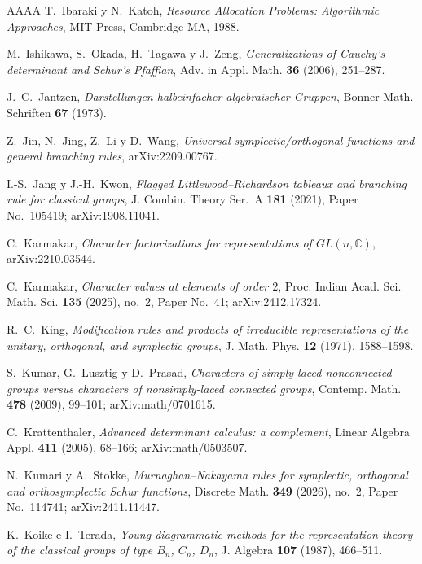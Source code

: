 \documentclass[11pt,reqno]{amsart}
\theoremstyle{plain}
\theoremstyle{definition}
\newcommand{\CC}{\mathbb{C}}
\begin{document}
\begin{thebibliography}{AAAA}
 T.~Ibaraki y N.~Katoh, \emph{Resource Allocation Problems: Algorithmic
Approaches}, MIT Press, Cambridge MA, 1988.

 M.~Ishikawa, S.~Okada, H.~Tagawa y J.~Zeng, \emph{Generalizations of
Cauchy's determinant and Schur's Pfaffian}, Adv. in Appl. Math. \textbf{36} (2006), 251--287.

 J.~C.~Jantzen, \emph{Darstellungen halbeinfacher algebraischer Gruppen},
Bonner Math. Schriften \textbf{67} (1973).

 Z.~Jin, N.~Jing, Z.~Li y D.~Wang, \emph{Universal symplectic/orthogonal
functions and general branching rules}, arXiv:2209.00767.

 I.-S.~Jang y J.-H.~Kwon, \emph{Flagged Littlewood--Richardson tableaux
and branching rule for classical groups}, J. Combin. Theory Ser.~A \textbf{181} (2021),
Paper No.~105419; arXiv:1908.11041.

 C.~Karmakar, \emph{Character factorizations for representations of
$GL(n,\CC)$}, arXiv:2210.03544.

 C.~Karmakar, \emph{Character values at elements of order $2$},
Proc. Indian Acad. Sci. Math. Sci. \textbf{135} (2025), no.~2, Paper No.~41; arXiv:2412.17324.

 R.~C.~King, \emph{Modification rules and products of irreducible
representations of the unitary, orthogonal, and symplectic groups}, J. Math. Phys. \textbf{12}
(1971), 1588--1598.

 S.~Kumar, G.~Lusztig y D.~Prasad, \emph{Characters of simply-laced
nonconnected groups versus characters of nonsimply-laced connected groups}, Contemp. Math.
\textbf{478} (2009), 99--101; arXiv:math/0701615.

 C.~Krattenthaler, \emph{Advanced determinant calculus: a complement},
Linear Algebra Appl. \textbf{411} (2005), 68--166; arXiv:math/0503507.

 N.~Kumari y A.~Stokke, \emph{Murnaghan--Nakayama rules for symplectic,
orthogonal and orthosymplectic Schur functions}, Discrete Math. \textbf{349} (2026), no.~2, Paper
No.~114741; arXiv:2411.11447.

 K.~Koike e I.~Terada, \emph{Young-diagrammatic methods for the representation
theory of the classical groups of type $B_n$, $C_n$, $D_n$}, J. Algebra \textbf{107} (1987),
466--511.


\end{thebibliography}
\end{document}
